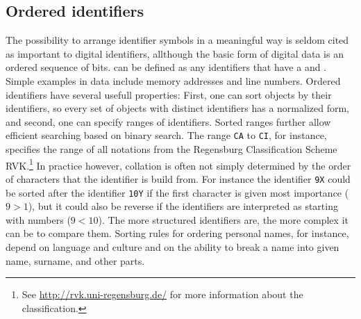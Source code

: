 
\subsection{Ordered identifiers}
\label{sec:orderedids}

The possibility to arrange identifier symbols in a meaningful way is seldom
cited as important to digital identifiers, allthough the basic form of digital
data is an ordered sequence of bits. 
 can be defined as any 
identifiers that have a  and . 
Simple examples in data include memory addresses and line numbers. Ordered 
identifiers have several usefull properties: First, one can sort objects
by their  identifiers, so every set of objects with distinct identifiers has
a normalized form, and second, one can specify ranges of identifiers. Sorted
ranges further allow efficient searching based on binary search.
The range \texttt{CA} to \texttt{CI}, for instance, specifies the range of all 
notations from the Regensburg Classification Scheme RVK.\footnote{See 
\url{http://rvk.uni-regensburg.de/} for more information about the classification.}
In practice however, collation is often not simply determined by the order of 
characters that the identifier is build from. For instance the identifier 
\texttt{9X} could be sorted after the identifier \texttt{10Y} if the first 
character is given most importance ($9 > 1$), but it could also be reverse if the 
identifiers are interpreted as starting with numbers ($9 < 10$). The more
structured identifiers are, the more complex it can be to compare them.
Sorting rules for ordering personal names, for instance, depend on language
and culture and on the ability to break a name into given name, surname, and 
other parts.


